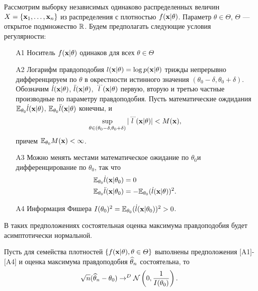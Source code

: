 Рассмотрим выборку независимых одинаково распределенных величин $X = \{\mathbf{x}_1, \ldots, \mathbf{x}_{n} \}$ из распределения с плотностью $f(\mathbf{x} | \theta)$. 
Параметр $\theta \in \Theta$, $\Theta$ --- открытое подмножество $\mathbb{R}$.
Будем предполагать следующие условия регулярности:
\begin{itemize}
	\item[A1] Носитель $f(\mathbf{x} | \theta)$ одинаков для всех $\theta \in \Theta$
	\item[A2] Логарифм правдоподобия $l(\mathbf{x} | \theta) = \log p(\mathbf{x} | \theta)$ трижды непрерывно дифференцируем по $\theta$ в окрестности истинного значения $(\theta_0 - \delta, \theta_0 + \delta)$. Обозначим $\dot{l}(\mathbf{x} | \theta)$,
	$\ddot{l}(\mathbf{x} | \theta)$, $\dddot{l}(\mathbf{x} | \theta)$ первую, вторую и третью частные производные по параметру правдоподобия. Пусть математические ождидания $\mathbb{E}_{\theta_0} \dot{l}(\mathbf{x} | \theta)$, 
	$\mathbb{E}_{\theta_0} \ddot{l}(\mathbf{x} | \theta)$ конечны, и
	\[
	\sup_{\theta \in (\theta_0 - \delta, \theta_0 + \delta)} |\dddot{l}(\mathbf{x} | \theta)| < M(\mathbf{x}),
	\]
	причем $\mathbb{E}_{\theta_0} M(\mathbf{x}) < \infty$.
	\item[A3] Можно менять местами математическое ожидание по $\theta_0$и дифференцирование по $\theta_0$, так что
	\begin{align*}
	\mathbb{E}_{\theta_0} \dot{l}(\mathbf{x} | \theta_0) &= 0 \\
	\mathbb{E}_{\theta_0} \ddot{l}(\mathbf{x} | \theta_0) &= - \mathbb{E}_{\theta_0} (\dot{l}(\mathbf{x} | \theta))^2.
	\end{align*}
	\item[A4] Информация Фишера $I(\theta_0)^2 = \mathbb{E}_{\theta_0} (\dot{l}(\mathbf{x} | \theta_0))^2 > 0$.
\end{itemize}

В таких предположениях состоятельная оценка максимума правдоподобия
будет асимптотически нормальной.

\begin{Theorem}
Пусть для семейства плотностей $\{f(\mathbf{x}|\theta), \theta \in \varTheta\}$ выполнены предположения [A1]-[A4] и оценка максимума правдоподобия $\widehat{\theta}_{n}$ состоятельна, то
\[
\sqrt{n} (\widehat{\theta}_{n} - \theta_0) \rightarrow^D \mathcal{N} \left(0, \frac{1}{I(\theta_0)}\right).
\]
\end{Theorem}

